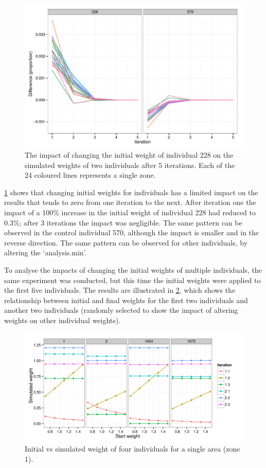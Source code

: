 \documentclass[a4paper,10pt]{article}
\begin{document}
\begin{figure}
 \begin{center}
  \includegraphics[width=12cm]{weight-1-5-its}
 \end{center}
\caption{The impact of changing the initial weight of individual 228 on the simulated weights of two individuals after 5 iterations. Each of the 24 coloured lines represents a single zone.}
\label{ficweight}
\end{figure}

\cref{ficweight} shows that changing initial weights 
for individuals has a limited impact on the results that
 tends to zero from one iteration to the next. 
After iteration one the impact of a 100\% increase in the initial weight 
of individual 228 had reduced to 0.3\%; after 3 iterations the impact was negligible. 
The same pattern can be observed in the control individual 570, 
although the impact is smaller and in the reverse direction. 
The same pattern can be observed for other individuals, by altering the `analysis.min'.

To analyse the impacts of changing the initial weights of multiple 
individuals, the same experiment was conducted, but this time the initial weights were
applied to the first five individuals. The results are illustrated in \cref{finweight},
which shows the relationship between initial and final weights for the first two individuals
and another two individuals 
(randomly selected to show the impact of altering weights on other individual weights). 

\begin{figure}
 \begin{center}
  \includegraphics[width=12cm]{weights-exp-54nice2}
 \end{center}
\caption{Initial vs simulated weight of four individuals for a single area (zone 1).}
\label{finweight}
\end{figure}
\end{document}
